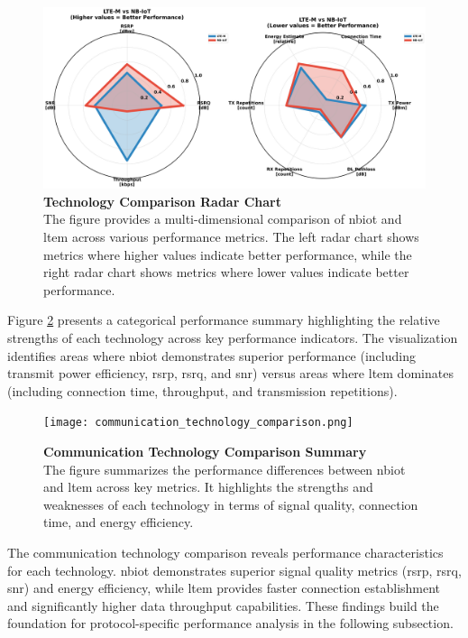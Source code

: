 \documentclass[12pt, english, openany]{book}
\begin{document}
\begin{figure}[htbp]
    \centering
    \includegraphics[width=1.0\textwidth]{technology_radar_comparison.png}
    \caption{\textbf{Technology Comparison Radar Chart} \\ The figure provides a multi-dimensional comparison of \gls{nbiot} and \gls{ltem} across various performance metrics. The left radar chart shows metrics where higher values indicate better performance, while the right radar chart shows metrics where lower values indicate better performance.}
    \label{fig:technology_radar}
\end{figure}

Figure \ref{fig:communication_technology_comparison_summary} presents a categorical performance summary highlighting the relative strengths of each technology across key performance indicators. The visualization identifies areas where \gls{nbiot} demonstrates superior performance (including transmit power efficiency, \gls{rsrp}, \gls{rsrq}, and \gls{snr}) versus areas where \gls{ltem} dominates (including connection time, throughput, and transmission repetitions).

\begin{figure}[htbp]
    \centering
    \texttt{[image: communication\_technology\_comparison.png]}
    \caption{\textbf{Communication Technology Comparison Summary} \\ The figure summarizes the  performance differences between \gls{nbiot} and \gls{ltem} across key metrics. It highlights the strengths and weaknesses of each technology in terms of signal quality, connection time, and energy efficiency.}
    \label{fig:communication_technology_comparison_summary}
\end{figure}

The communication technology comparison reveals performance characteristics for each technology. \gls{nbiot} demonstrates superior signal quality metrics (\gls{rsrp}, \gls{rsrq}, \gls{snr}) and energy efficiency, while \gls{ltem} provides faster connection establishment and significantly higher data throughput capabilities. These findings build the foundation for protocol-specific performance analysis in the following subsection.
\end{document}
